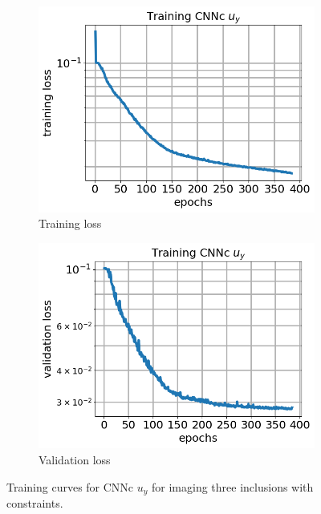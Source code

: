 \documentclass[12pt]{article}
\newcommand{\nhgfigheight}{4.0cm}
\begin{document}
\begin{figure}[h]
  \centering
  \begin{subfigure}[b]{0.45\linewidth}
    \includegraphics[totalheight=\nhgfigheight]{Figures/final3c/training/uy/field_imagesy_plot_loss.png}
    \caption{Training loss}
  \end{subfigure}
  \begin{subfigure}[b]{0.45\linewidth}
    \includegraphics[totalheight=\nhgfigheight]{Figures/final3c/training/uy/field_imagesy_plot_val_loss.png}
    \caption{Validation loss}
  \end{subfigure}
\caption{\label{fig:threeinctanh:trainuy} Training curves for CNNc $u_y$ for imaging three inclusions with constraints.}
\end{figure}
\end{document}

